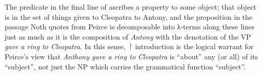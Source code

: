 \documentclass[output=paper,colorlinks,citecolor=brown]{langscibook}
\begin{document}
\begin{exe}
 \ex\label{cleopatra}
\end{exe}
The predicate in the final line of  ascribes a property to
some object; that object is in the set of things given to Cleopatra to
Antony, and the proposition in the passage Noth quotes from Peirce is
decomposable into λ-terms along these lines just as much as it is the
composition of \textit{Antony} with the denotation of the VP \textit{gave a ring to
Cleopatra}. In this sense, \ensuremath{\vs} introduction is the logical warrant for
Peirce's view that \textit{Anthony gave a ring to Cleopatra} is ``about''
any (or all) of its ``subject'', not just the NP which carries the
grammatical function ``subject''.
\end{document}
